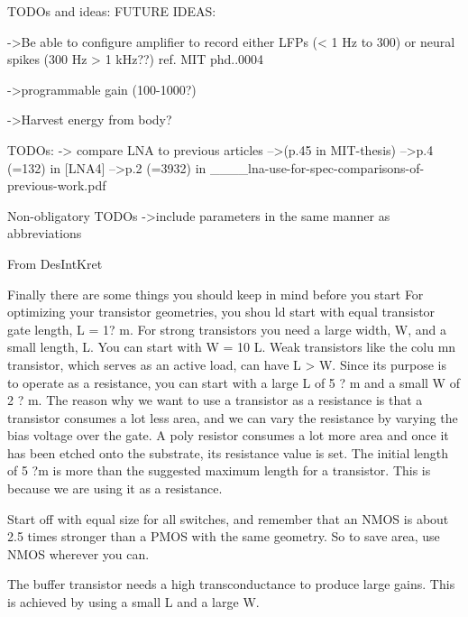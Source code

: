 TODOs and ideas:
  FUTURE IDEAS:
  {
    ->Be able to configure amplifier to record either LFPs (< 1 Hz to 300) or neural spikes (300 Hz > 1 kHz??)
    ref. MIT phd..0004
    
    ->programmable gain (100-1000?)
    
    ->Harvest energy from body?
   }
    
  TODOs:
  {
    -> compare LNA to previous articles 
            -->(p.45 in MIT-thesis) 
	    -->p.4 (=132) in [LNA4]
	    -->p.2 (=3932) in ____lna-use-for-spec-comparisons-of-previous-work.pdf	   
  }
  
  Non-obligatory TODOs
  {
    ->include parameters in the same manner as abbreviations
  }
  
  
  From DesIntKret
  {
    Finally there are some things you should keep in mind before you start 
    For  optimizing  your  transistor  geometries,  you  shou ld  start  with  equal  transistor  gate  length, 
    L = 1? m.  For  strong  transistors  you  need  a  large  width,  W,  and  a  small  length,  L.  You  can start  with  W = 10 L.  Weak  transistors  like  the  colu
    mn  transistor,  which  serves  as  an  active load, can have L > W. Since its purpose is to operate as a resistance, you can start with a large 
    L of 5 ? m and a small W of 2 ? m. The reason why we want to use a transistor as a resistance is that a transistor consumes a lot less area, and 
    we can vary the resistance by varying the bias voltage  over  the  gate.  A  poly  resistor  consumes  a  lot  more  area  and  once  it  has  been  etched 
    onto  the  substrate,  its  resistance  value  is  set.  The  initial  length  of  5 ?m  is  more  than  the suggested maximum length for a transistor. This is 
    because we are using it as a resistance. 

    Start  off  with  equal  size  for  all  switches,  and  remember  that  an  NMOS  is  about  2.5  times 
    stronger  than  a  PMOS  with  the  same  geometry.  So  to save  area,  use  NMOS  wherever  you can. 

    The  buffer  transistor  needs  a  high  transconductance to  produce  large  gains.  This  is  achieved 
    by using a small L and a large W. 
  }
